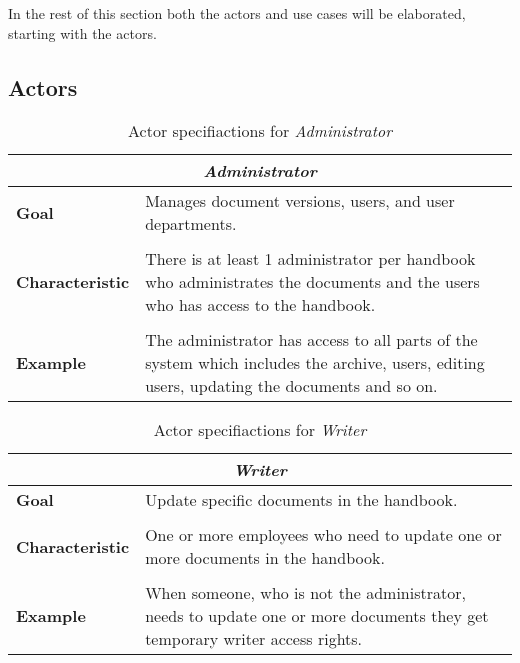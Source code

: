 In the rest of this section both the actors and use cases will be elaborated, starting with the actors.

\subsection{Actors}\label{sec:Actors}
\begin{table}[H]
	\begin{tabular}{l m{11.3cm}}
		\hline
		\multicolumn{2}{c}{\textbf{\textit{Administrator}}}\\
		\hline
		\textbf{Goal} &  Manages document versions, users, and user departments. \\
		 &  \\
		\textbf{Characteristic} & There is at least 1 administrator per handbook who administrates the documents and the users who has access to the handbook. \\
		 &  \\
		\textbf{Example} & The administrator has access to all parts of the system which includes the archive, users, editing users, updating the documents and so on. \\
		\hline
	\end{tabular}
\caption{Actor specifiactions for \textit{Administrator}}\label{tab:Actor-admin}
\end{table}

\begin{table}[H]
	\begin{tabular}{l m{11.3cm}}
		\hline
		\multicolumn{2}{c}{\textbf{\textit{Writer}}}\\
		\hline
		\textbf{Goal} & Update specific documents in the handbook. \\
	 	 &  \\
		\textbf{Characteristic} &  One or more employees who need to update one or more documents in the handbook. \\
		 &  \\
		\textbf{Example} & When someone, who is not the administrator, needs to update one or more documents they get temporary writer access rights.\\
		\hline
	\end{tabular}
	\caption{Actor specifiactions for \textit{Writer}}\label{tab:Actor-write}
\end{table}

